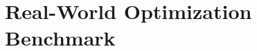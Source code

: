 \documentclass{article}
\begin{document}


\section{Real-World Optimization Benchmark}




\end{document}
